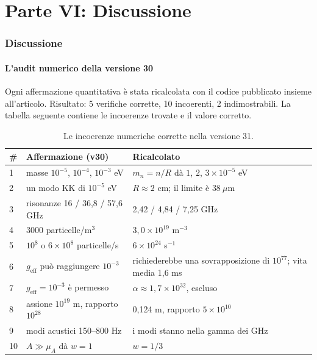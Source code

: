 \part*{Parte VI: Discussione}

\section{Discussione}
\subsection{L'audit numerico della versione 30}
Ogni affermazione quantitativa è stata ricalcolata con il codice pubblicato insieme all'articolo. Risultato: 5 verifiche corrette, 10 incoerenti, 2 indimostrabili. La tabella seguente contiene le incoerenze trovate e il valore corretto.

\begin{table}[H]
\centering
\small
\begin{tabular}{@{}p{0.5cm}p{6.2cm}p{5.2cm}@{}}
\toprule
\# & \textbf{Affermazione (v30)} & \textbf{Ricalcolato} \\ \midrule
1 & masse $10^{-5}$, $10^{-4}$, $10^{-3}$ eV & $m_n = n/R$ dà $1$, $2$, $3 \times 10^{-5}$ eV \\
2 & un modo KK di $10^{-5}$ eV & $R \approx 2$ cm; il limite è $38\ \mu$m \\
3 & risonanze 16 / 36,8 / 57,6 GHz & 2,42 / 4,84 / 7,25 GHz \\
4 & 3000 particelle/m$^3$ & $3,0\times10^{19}$ m$^{-3}$ \\
5 & $10^8$ o $6\times10^8$ particelle/s & $6\times10^{24}$ s$^{-1}$ \\
6 & $g_{\text{eff}}$ può raggiungere $10^{-3}$ & richiederebbe una sovrapposizione di $10^{77}$; vita media 1,6 ms \\
7 & $g_{\text{eff}} = 10^{-3}$ è permesso & $\alpha \approx 1,7\times10^{32}$, escluso \\
8 & assione $10^{19}$ m, rapporto $10^{28}$ & 0,124 m, rapporto $5\times10^{10}$ \\
9 & modi acustici 150--800 Hz & i modi stanno nella gamma dei GHz \\
10 & $A \gg \mu_A$ dà $w = 1$ & $w = 1/3$ \\ \bottomrule
\end{tabular}
\caption{Le incoerenze numeriche corrette nella versione 31.}
\label{tab:audit}
\end{table}

